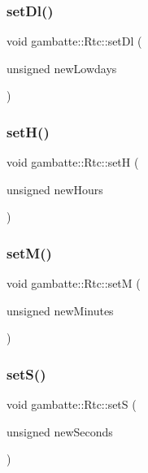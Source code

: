 \subsubsection{\texorpdfstring{set\+Dl()}{setDl()}}
{\footnotesize\ttfamily void gambatte\+::\+Rtc\+::set\+Dl (\begin{DoxyParamCaption}\item[{unsigned}]{new\+Lowdays }\end{DoxyParamCaption})\hspace{0.3cm}{\ttfamily [private]}}

\mbox{\label{classgambatte_1_1Rtc_a5c25869bfe3b68d55fe17368b248689b}} 
\subsubsection{\texorpdfstring{set\+H()}{setH()}}
{\footnotesize\ttfamily void gambatte\+::\+Rtc\+::setH (\begin{DoxyParamCaption}\item[{unsigned}]{new\+Hours }\end{DoxyParamCaption})\hspace{0.3cm}{\ttfamily [private]}}

\mbox{\label{classgambatte_1_1Rtc_a25b387d4b43ab3fd98d236d4e1e7ddd3}} 
\subsubsection{\texorpdfstring{set\+M()}{setM()}}
{\footnotesize\ttfamily void gambatte\+::\+Rtc\+::setM (\begin{DoxyParamCaption}\item[{unsigned}]{new\+Minutes }\end{DoxyParamCaption})\hspace{0.3cm}{\ttfamily [private]}}

\mbox{\label{classgambatte_1_1Rtc_ab12534239b606a886e7eada91c107293}} 
\subsubsection{\texorpdfstring{set\+S()}{setS()}}
{\footnotesize\ttfamily void gambatte\+::\+Rtc\+::setS (\begin{DoxyParamCaption}\item[{unsigned}]{new\+Seconds }\end{DoxyParamCaption})\hspace{0.3cm}{\ttfamily [private]}}

